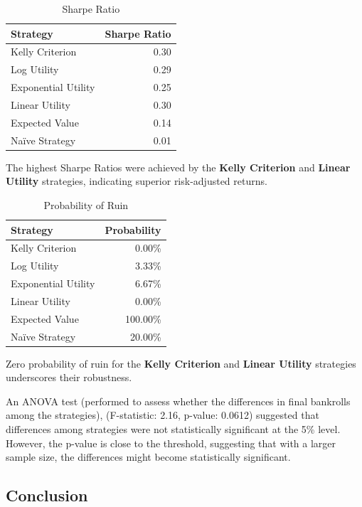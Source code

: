 \begin{table}[H]
\centering
\caption{Sharpe Ratio}
\label{tab:sharpe_ratio}
\begin{tabular}{lr}
\toprule
\textbf{Strategy} & \textbf{Sharpe Ratio} \\
\midrule
Kelly Criterion          & 0.30 \\
Log Utility              & 0.29 \\
Exponential Utility      & 0.25 \\
Linear Utility           & 0.30 \\
Expected Value           & 0.14 \\
Naïve Strategy           & 0.01 \\
\bottomrule
\end{tabular}
\end{table}

The highest Sharpe Ratios were achieved by the \textbf{Kelly Criterion} and \textbf{Linear Utility} strategies, indicating superior risk-adjusted returns.

\begin{table}[H]
\centering
\caption{Probability of Ruin}
\label{tab:prob_ruin}
\begin{tabular}{lr}
\toprule
\textbf{Strategy} & \textbf{Probability} \\
\midrule
Kelly Criterion          & 0.00\% \\
Log Utility              & 3.33\% \\
Exponential Utility      & 6.67\% \\
Linear Utility           & 0.00\% \\
Expected Value           & 100.00\% \\
Naïve Strategy           & 20.00\% \\
\bottomrule
\end{tabular}
\end{table}

Zero probability of ruin for the \textbf{Kelly Criterion} and \textbf{Linear Utility} strategies underscores their robustness.

An ANOVA test (performed to assess whether the differences in final bankrolls among the strategies), (F-statistic: 2.16, p-value: 0.0612) suggested that differences among strategies were not statistically significant at the 5\% level. However, the p-value is close to the threshold, suggesting that with a larger sample size, the differences might become statistically significant.

\subsection{Conclusion}

